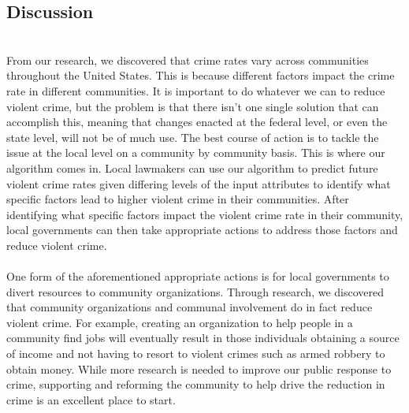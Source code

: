 \documentclass[letterpaper, 11 pt, conference]{article}
\begin{document}
\subsection{Discussion}
\\From our research, we discovered that crime rates vary across communities throughout the United States. This is because different factors impact the crime rate in different communities. It is important to do whatever we can to reduce violent crime, but the problem is that there isn't one single solution that can accomplish this, meaning that changes enacted at the federal level, or even the state level, will not be of much use. The best course of action is to tackle the issue at the local level on a community by community basis. This is where our algorithm comes in. Local lawmakers can use our algorithm to predict future violent crime rates given differing levels of the input attributes to identify what specific factors lead to higher violent crime in their communities. After identifying what specific factors impact the violent crime rate in their community, local governments can then take appropriate actions to address those factors and reduce violent crime.
\\
\\One form of the aforementioned appropriate actions is for local governments to divert resources to community organizations. Through research, we discovered that community organizations and communal involvement do in fact reduce violent crime. For example, creating an organization to help people in a community find jobs will eventually result in those individuals obtaining a source of income and not having to resort to violent crimes such as armed robbery to obtain money. While more research is needed to improve our public response to crime, supporting and reforming the community to help drive the reduction in crime is an excellent place to start.

\clearpage


\end{document}
